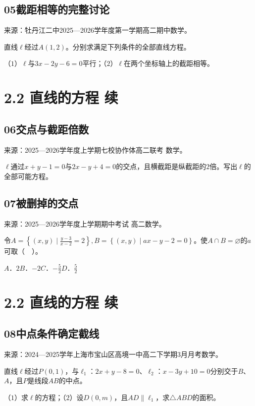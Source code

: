 \documentclass[UTF8,11pt,a4paper,fontset=windows]{ctexart}
\newcommand{\qhead}[2]{\subsection{#1\texorpdfstring{\quad}{ }#2}}
\newcommand{\qsource}[1]{{\footnotesize 来源：#1。\par}}
\begin{document}
\qhead{05}{截距相等的完整讨论}
\qsource{牡丹江二中2025—2026学年度第一学期高二期中数学}
直线\(\ell \)经过\(A\left(1,\allowbreak 2\right)\)。分别求满足下列条件的全部直线方程。\par
（\(1\)）\(\ell \)与\(3x- 2y- 6= 0\)平行；（\(2\)）\(\ell \)在两个坐标轴上的截距相等。\par
\vspace{12mm}\vfill

\mbox{}

\clearpage

\section{2.2 直线的方程 续}

\qhead{06}{交点与截距倍数}
\qsource{2025—2026学年度上学期七校协作体高二联考 数学}
\(\ell \)通过\(x+ y- 1= 0\)与\(2x- y+ 4= 0\)的交点，且横截距是纵截距的\(2\)倍。写出\(\ell \)的全部可能方程。\par
\vspace{12mm}\vfill

\qhead{07}{被删掉的交点}
\qsource{2025—2026学年度上学期期中考试 高二数学}
令\(A= \left\{\left(x,\allowbreak y\right)\mid \frac{y- 3}{x- 2}= 2\right\},\allowbreak B= \left\{\left(x,\allowbreak y\right)\mid ax- y- 2= 0\right\}\)。使\(A\cap B= \varnothing \)的\(a\)可取（　）。\par
\(A\)．\(2\)\qquad \(B\)．\(- 2\)\qquad \(C\)．\(- \frac{5}{2}\)\qquad \(D\)．\(\frac{5}{2}\)\par
\vspace{12mm}\vfill

\mbox{}

\clearpage

\section{2.2 直线的方程 续}

\qhead{08}{中点条件确定截线}
\qsource{2024—2025学年上海市宝山区高境一中高二下学期3月月考数学}
直线\(\ell \)经过\(P\left(0,\allowbreak 1\right)\)，与\(\ell _{1}\)：\(2x+ y- 8= 0\)、\(\ell _{2}\)：\(x- 3y+ 10= 0\)分别交于\(B\)、\(A\)，且\(P\)是线段\(AB\)的中点。\par
（\(1\)）求\(\ell \)的方程；（\(2\)）设\(D\left(0,\allowbreak m\right)\)，且\(AD\parallel \ell _{1}\)，求\(\triangle ABD\)的面积。\par
\vspace{12mm}\vfill

\mbox{}
\end{document}
